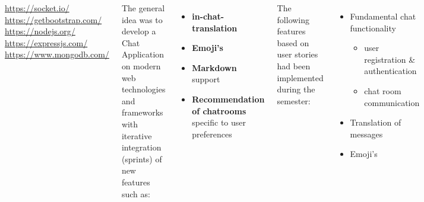 \documentclass[20pt, a1paper]{tikzposter}
\begin{document}
\begin{columns}
{		\url{https://socket.io/}\\
		\url{https://getbootstrap.com/}\\
		\url{https://nodejs.org/}\\
		\url{https://expressjs.com/}\\
		\url{https://www.mongodb.com/}\\
	}

	{
		The general idea was to develop a Chat Application on modern web technologies and frameworks with iterative integration (sprints) of new features such as:
		\begin{itemize}
			\item \textbf{in-chat-translation}
			\item \textbf{Emoji's}
			\item \textbf{Markdown} support
			\item \textbf{Recommendation of chatrooms} specific to user preferences
		\end{itemize}
	
	}
	{
		The following features based on user stories had been implemented during the semester:
		\begin{itemize}
			\item Fundamental chat functionality
			\begin{itemize}
				\item user registration \& authentication
				\item chat room communication
			\end{itemize}
			\item Translation of messages
			\item Emoji's 
		\end{itemize}
		
}
\end{columns}
\end{document}
